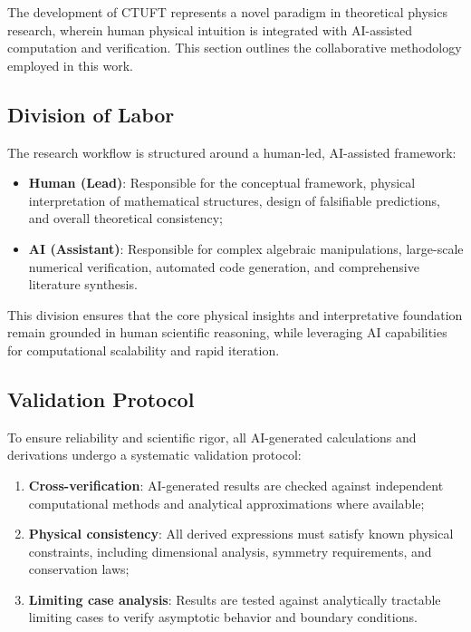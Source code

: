 \documentclass[twocolumn, tightenlines, showpacs, showkeys, nofootinbib]{revtex4-1}
\begin{document}
The development of CTUFT represents a novel paradigm in theoretical 
physics research, wherein human physical intuition is integrated with 
AI-assisted computation and verification. This section outlines the 
collaborative methodology employed in this work.

\subsection{Division of Labor}

The research workflow is structured around a human-led, AI-assisted 
framework:

\begin{itemize}
    \item \textbf{Human (Lead)}: Responsible for the conceptual framework, 
          physical interpretation of mathematical structures, design of 
          falsifiable predictions, and overall theoretical consistency;
    
    \item \textbf{AI (Assistant)}: Responsible for complex algebraic 
          manipulations, large-scale numerical verification, automated 
          code generation, and comprehensive literature synthesis.
\end{itemize}

This division ensures that the core physical insights and interpretative 
foundation remain grounded in human scientific reasoning, while leveraging 
AI capabilities for computational scalability and rapid iteration.

\subsection{Validation Protocol}

To ensure reliability and scientific rigor, all AI-generated calculations 
and derivations undergo a systematic validation protocol:

\begin{enumerate}
    \item \textbf{Cross-verification}: AI-generated results are checked 
          against independent computational methods and analytical 
          approximations where available;
    
    \item \textbf{Physical consistency}: All derived expressions must 
          satisfy known physical constraints, including dimensional 
          analysis, symmetry requirements, and conservation laws;
    
    \item \textbf{Limiting case analysis}: Results are tested against 
          analytically tractable limiting cases to verify asymptotic 
          behavior and boundary conditions.
\end{enumerate}
\end{document}
